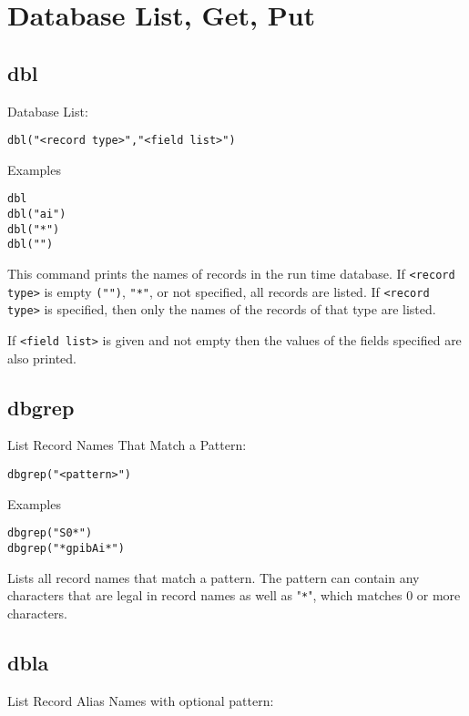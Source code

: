 \section{Database List, Get, Put}

\subsection{dbl}

Database List:

\begin{verbatim}
dbl("<record type>","<field list>")
\end{verbatim}

Examples

\begin{verbatim}
dbl
dbl("ai")
dbl("*")
dbl("")
\end{verbatim}

This command prints the names of records in the run time database. If \verb|<record type>| is empty \verb|("")|, \verb|"*"|, or not 
specified, all records are listed. If \verb|<record type>| is specified, then only the names of the records of that type are 
listed.

If \verb|<field list>| is given and not empty then the values of the fields specified are also printed.

\subsection{dbgrep}

List Record Names That Match a Pattern:

\begin{verbatim}
dbgrep("<pattern>")
\end{verbatim}

Examples

\begin{verbatim}
dbgrep("S0*")
dbgrep("*gpibAi*")
\end{verbatim}

Lists all record names that match a pattern. The pattern can contain any characters that are legal in record names as well as 
"\verb|*|", which matches 0 or more characters.

\subsection{dbla}

List Record Alias Names with optional pattern:

